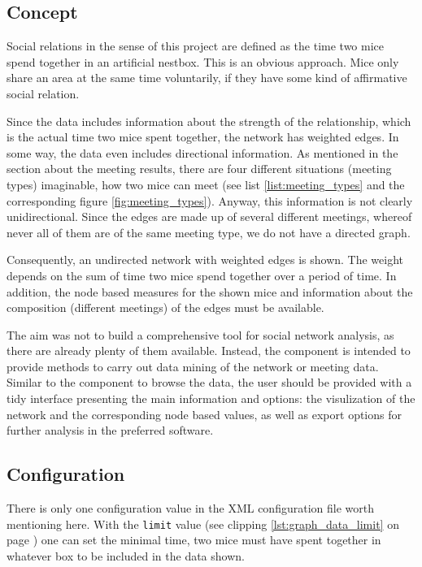 \subsection{Concept}
\label{subsec:graph_concept}

Social relations in the sense of this project are defined as the time two mice spend together in an artificial nestbox. This is an obvious approach. Mice only share an area at the same time voluntarily, if they have some kind of affirmative social relation.

Since the data includes information about the strength of the relationship, which is the actual time two mice spent together, the network has weighted edges. In some way, the data even includes directional information. As mentioned in the section about the meeting results, there are four different situations (meeting types) imaginable, how two mice can meet (see list \ref{list:meeting_types} and the corresponding figure \ref{fig:meeting_types}). Anyway, this information is not clearly unidirectional. Since the edges are made up of several different meetings, whereof never all of them are of the same meeting type, we do not have a directed graph.

Consequently, an undirected network with weighted edges is shown. The weight depends on the sum of time two mice spend together over a period of time. In addition, the node based measures for the shown mice and information about the composition (different meetings) of the edges must be available.

The aim was not to build a comprehensive tool for social network analysis, as there are already plenty of them available. Instead, the component is intended to provide methods to carry out data mining of the network or meeting data. Similar to the component to browse the data, the user should be provided with a tidy interface presenting the main information and options: the visulization of the network and the corresponding node based values, as well as export options for further analysis in the preferred software.

\subsection{Configuration}
\label{subsec:graph_explore}

There is only one configuration value in the XML configuration file worth mentioning here. With the \lstinline|limit| value (see clipping \ref{lst:graph_data_limit} on page \pageref{lst:graph_data_limit}) one can set the minimal time, two mice must have spent together in whatever box to be included in the data shown. 

